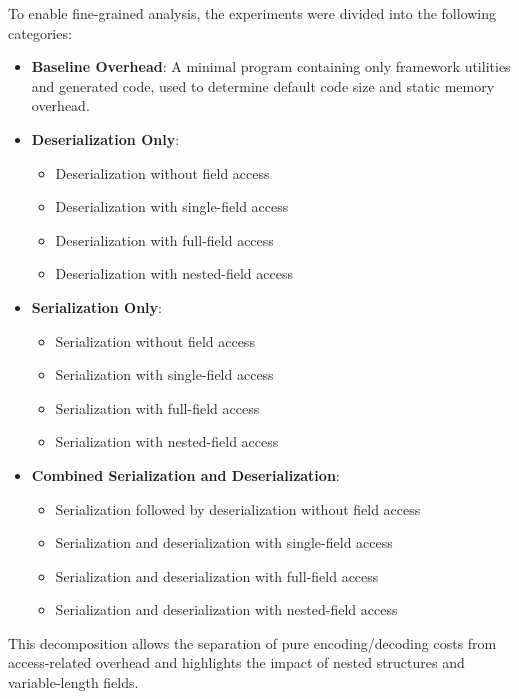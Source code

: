 \documentclass[11pt, a4paper]{article}
\begin{document}
To enable fine-grained analysis, the experiments were divided into the following categories:

\begin{itemize}
    \item \textbf{Baseline Overhead}: A minimal program containing only framework utilities and generated code, used to determine default code size and static memory overhead.

    \item \textbf{Deserialization Only}:
          \begin{itemize}
              \item Deserialization without field access
              \item Deserialization with single-field access
              \item Deserialization with full-field access
              \item Deserialization with nested-field access
          \end{itemize}

    \item \textbf{Serialization Only}:
          \begin{itemize}
              \item Serialization without field access
              \item Serialization with single-field access
              \item Serialization with full-field access
              \item Serialization with nested-field access
          \end{itemize}

    \item \textbf{Combined Serialization and Deserialization}:
          \begin{itemize}
              \item Serialization followed by deserialization without field access
              \item Serialization and deserialization with single-field access
              \item Serialization and deserialization with full-field access
              \item Serialization and deserialization with nested-field access
          \end{itemize}
\end{itemize}

This decomposition allows the separation of pure encoding/decoding costs from access-related overhead and highlights the impact of nested structures and variable-length fields.
\end{document}

